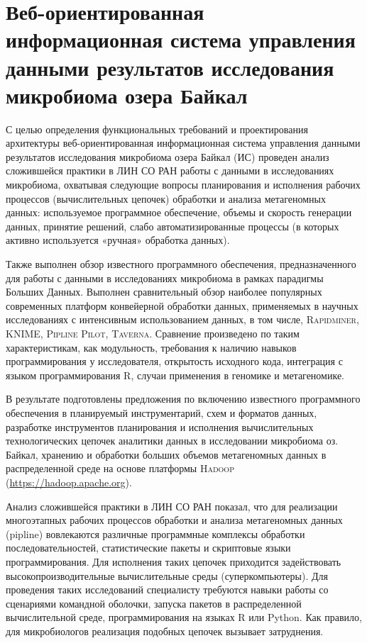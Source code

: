 \documentclass[a4paper,12pt,openany,final]{extreport}
\begin{document}
\chapter{Веб-ориентированная информационная система управления
данными результатов исследования микробиома озера Байкал}\label{chap:6}

С целью определения функциональных требований и проектирования
архитектуры веб-ориентированная информационная система управления
данными результатов исследования микробиома озера Байкал (ИС) проведен
анализ сложившейся практики в ЛИН СО РАН работы с данными в
исследованиях микробиома, охватывая следующие вопросы планирования и
исполнения рабочих процессов (вычислительных цепочек) обработки и
анализа метагеномных данных: используемое программное обеспечение,
объемы и скорость генерации данных, принятие решений, слабо
автоматизированные процессы (в которых активно используется «ручная»
обработка данных).

Также выполнен обзор известного программного обеспечения,
предназначенного для работы с данными в исследованиях микробиома в
рамках парадигмы Больших Данных. Выполнен сравнительный обзор наиболее
популярных современных платформ конвейерной обработки данных,
применяемых в научных исследованиях с интенсивным использованием данных,
в том числе, \textsc{Rapidminer}, KNIME, \textsc{Pipline Pilot},
\textsc{Taverna}. Сравнение произведено по таким характеристикам, как
модульность, требования к наличию навыков программирования у
исследователя, открытость исходного кода, интеграция с языком
программирования R, случаи применения в геномике и метагеномике.

В результате подготовлены предложения по включению известного
программного обеспечения в планируемый инструментарий, схем и форматов
данных, разработке инструментов планирования и исполнения вычислительных
технологических цепочек аналитики данных в исследовании микробиома оз.
Байкал, хранению и обработки больших объемов метагеномных данных в
распределенной среде на основе платформы \textsc{Hadoop}
(\href{https://hadoop.apache.org/}{{https://hadoop.apache.org}}).

Анализ сложившейся практики в ЛИН СО РАН показал, что для реализации
многоэтапных рабочих процессов обработки и анализа метагеномных данных
(pipline) вовлекаются различные программные комплексы обработки
последовательностей, статистические пакеты и скриптовые языки
программирования. Для исполнения таких цепочек приходится задействовать
высокопроизводительные вычислительные среды (суперкомпьютеры). Для
проведения таких исследований специалисту требуются навыки работы со
сценариями командной оболочки, запуска пакетов в распределенной
вычислительной среде, программирования на языках R или Python. Как
правило, для микробиологов реализация подобных цепочек вызывает
затруднения.
\end{document}
